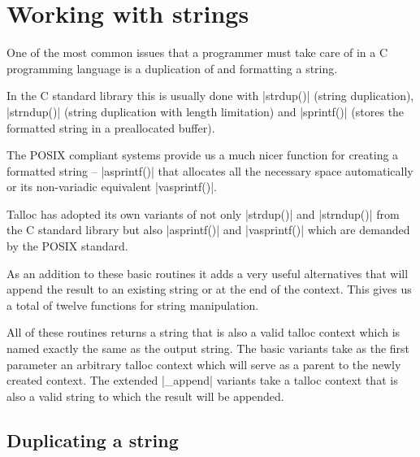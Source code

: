 \section{Working with strings}
\label{talloc:sec:strings}

One of the most common issues that a programmer must take care of in a C
programming language is a duplication of and formatting a string.

In the C standard library this is usually done with |strdup()| (string
duplication), |strndup()| (string duplication with length limitation) and
|sprintf()| (stores the formatted string in a preallocated buffer).

The POSIX compliant systems provide us a much nicer function for creating a
formatted string -- |asprintf()| that allocates all the necessary space
automatically or its non-variadic equivalent |vasprintf()|.

Talloc has adopted its own variants of not only |strdup()| and |strndup()| from
the C standard library but also |asprintf()| and |vasprintf()| which are
demanded by the POSIX standard.

As an addition to these basic routines it adds a very useful alternatives that
will append the result to an existing string or at the end of the context. This
gives us a total of twelve functions for string manipulation.

All of these routines returns a string that is also a valid talloc context
which is named exactly the same as the output string. The basic variants take as
the first parameter an arbitrary talloc context which will serve as a parent to
the newly created context. The extended |_append| variants take a talloc context
that is also a valid string to which the result will be appended.

\subsection{Duplicating a string}

